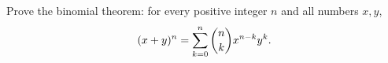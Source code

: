 Prove the binomial theorem: for every positive integer $n$ and all numbers $x,y$,
\[(x+y)^n=\sum_{k=0}^{n}\dbinom nk x^{n-k}y^k.\]

